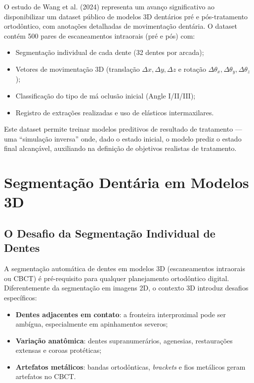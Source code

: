 O estudo de Wang et al. (2024) representa um avanço significativo ao disponibilizar um dataset público de modelos 3D dentários pré e pós-tratamento ortodôntico, com anotações detalhadas de movimentação dentária. O dataset contém 500 pares de escaneamentos intraorais (pré e pós) com:
\begin{itemize}
    \item Segmentação individual de cada dente (32 dentes por arcada);
    \item Vetores de movimentação 3D (translação $\Delta x, \Delta y, \Delta z$ e rotação $\Delta\theta_{x}, \Delta\theta_{y}, \Delta\theta_{z}$);
    \item Classificação do tipo de má oclusão inicial (Angle I/II/III);
    \item Registro de extrações realizadas e uso de elásticos intermaxilares.
\end{itemize}

Este dataset permite treinar modelos preditivos de resultado de tratamento --- uma ``simulação inversa'' onde, dado o estado inicial, o modelo prediz o estado final alcançável, auxiliando na definição de objetivos realistas de tratamento.

\section{Segmentação Dentária em Modelos 3D}

\subsection{O Desafio da Segmentação Individual de Dentes}

A segmentação automática de dentes em modelos 3D (escaneamentos intraorais ou CBCT) é pré-requisito para qualquer planejamento ortodôntico digital. Diferentemente da segmentação em imagens 2D, o contexto 3D introduz desafios específicos:
\begin{itemize}
    \item \textbf{Dentes adjacentes em contato}: a fronteira interproximal pode ser ambígua, especialmente em apinhamentos severos;
    \item \textbf{Variação anatômica}: dentes supranumerários, agenesias, restaurações extensas e coroas protéticas;
    \item \textbf{Artefatos metálicos}: bandas ortodônticas, \textit{brackets} e fios metálicos geram artefatos no CBCT.
\end{itemize}


